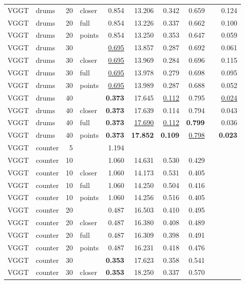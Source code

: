 \begin{table}[H]
\begin{tabular}{llrlrrrrrr}
VGGT & drums & 20 & closer & 0.854 & 13.206 & 0.342 & 0.659 &  & 0.124 \\
VGGT & drums & 20 & full & 0.854 & 13.226 & 0.337 & 0.662 &  & 0.100 \\
VGGT & drums & 20 & points & 0.854 & 13.250 & 0.353 & 0.647 &  & 0.059 \\
VGGT & drums & 30 &  & \underline{0.695} & 13.857 & 0.287 & 0.692 &  & 0.061 \\
VGGT & drums & 30 & closer & \underline{0.695} & 13.969 & 0.284 & 0.696 &  & 0.115 \\
VGGT & drums & 30 & full & \underline{0.695} & 13.978 & 0.279 & 0.698 &  & 0.095 \\
VGGT & drums & 30 & points & \underline{0.695} & 13.989 & 0.287 & 0.688 &  & 0.052 \\
VGGT & drums & 40 &  & \textbf{0.373} & 17.645 & \underline{0.112} & 0.795 &  & \underline{0.024} \\
VGGT & drums & 40 & closer & \textbf{0.373} & 17.639 & 0.114 & 0.794 &  & 0.043 \\
VGGT & drums & 40 & full & \textbf{0.373} & \underline{17.690} & \underline{0.112} & \textbf{0.799} &  & 0.036 \\
VGGT & drums & 40 & points & \textbf{0.373} & \textbf{17.852} & \textbf{0.109} & \underline{0.798} &  & \textbf{0.023} \\
\midrule
VGGT & counter & 5 &  & 1.194 &  &  &  &  &  \\
VGGT & counter & 10 &  & 1.060 & 14.631 & 0.530 & 0.429 &  &  \\
VGGT & counter & 10 & closer & 1.060 & 14.173 & 0.531 & 0.405 &  &  \\
VGGT & counter & 10 & full & 1.060 & 14.250 & 0.504 & 0.416 &  &  \\
VGGT & counter & 10 & points & 1.060 & 14.256 & 0.516 & 0.405 &  &  \\
VGGT & counter & 20 &  & 0.487 & 16.503 & 0.410 & 0.495 &  &  \\
VGGT & counter & 20 & closer & 0.487 & 16.380 & 0.408 & 0.489 &  &  \\
VGGT & counter & 20 & full & 0.487 & 16.309 & 0.398 & 0.491 &  &  \\
VGGT & counter & 20 & points & 0.487 & 16.231 & 0.418 & 0.476 &  &  \\
VGGT & counter & 30 &  & \textbf{0.353} & 17.623 & 0.358 & 0.541 &  &  \\
VGGT & counter & 30 & closer & \textbf{0.353} & 18.250 & 0.337 & 0.570 &  &  \\

\end{tabular}
\end{table}

